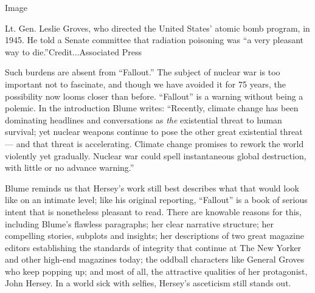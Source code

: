 Image

Lt. Gen. Leslie Groves, who directed the United States' atomic bomb
program, in 1945. He told a Senate committee that radiation poisoning
was ``a very pleasant way to die.''Credit...Associated Press

Such burdens are absent from ``Fallout.'' The subject of nuclear war is
too important not to fascinate, and though we have avoided it for 75
years, the possibility now looms closer than before. ``Fallout'' is a
warning without being a polemic. In the introduction Blume writes:
``Recently, climate change has been dominating headlines and
conversations as \emph{the} existential threat to human survival; yet
nuclear weapons continue to pose the other great existential threat ---
and that threat is accelerating. Climate change promises to rework the
world violently yet gradually. Nuclear war could spell instantaneous
global destruction, with little or no advance warning.''

Blume reminds us that Hersey's work still best describes what that would
look like on an intimate level; like his original reporting, ``Fallout''
is a book of serious intent that is nonetheless pleasant to read. There
are knowable reasons for this, including Blume's flawless paragraphs;
her clear narrative structure; her compelling stories, subplots and
insights; her descriptions of two great magazine editors establishing
the standards of integrity that continue at The New Yorker and other
high-end magazines today; the oddball characters like General Groves who
keep popping up; and most of all, the attractive qualities of her
protagonist, John Hersey. In a world sick with selfies, Hersey's
asceticism still stands out.

